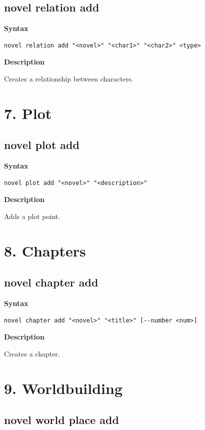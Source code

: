 \documentclass[11pt]{article}
\begin{document}
\subsection{novel relation add}

\textbf{Syntax}
\begin{verbatim}
novel relation add "<novel>" "<char1>" "<char2>" <type>
\end{verbatim}

\textbf{Description}

Creates a relationship between characters.

\section{7. Plot}

\subsection{novel plot add}

\textbf{Syntax}
\begin{verbatim}
novel plot add "<novel>" "<description>"
\end{verbatim}

\textbf{Description}

Adds a plot point.

\section{8. Chapters}

\subsection{novel chapter add}

\textbf{Syntax}
\begin{verbatim}
novel chapter add "<novel>" "<title>" [--number <num>]
\end{verbatim}

\textbf{Description}

Creates a chapter.

\section{9. Worldbuilding}

\subsection{novel world place add}
\end{document}
